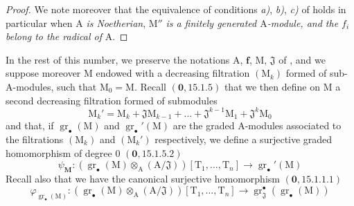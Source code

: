 \begin{proof}
We note moreover that the equivalence of conditions \emph{a)}, \emph{b)}, \emph{c)} of  holds in particular when $\mathrm{A}$ \emph{is Noetherian}, $\mathrm{M}''$ \emph{is a finitely generated $\mathrm{A}$-module, and the $f_i$ belong to the radical of} $\mathrm{A}$.
\end{proof}

\begin{env}[19.5.4]
\label{IV.19.5.4}
In the rest of this number, we preserve the notations $\mathrm{A}$, $\mathbf{f}$, $\mathrm{M}$, $\mathfrak{J}$ of , and we suppose moreover $\mathrm{M}$ endowed with a decreasing filtration $(\mathrm{M}_k)$ formed of sub-$\mathrm{A}$-modules, such that $\mathrm{M}_0=\mathrm{M}$. Recall $(\mathbf{0},15.1.5)$ that we then define on $\mathrm{M}$ a second decreasing filtration formed of submodules
\[
  \mathrm{M}_k'=\mathrm{M}_k+\mathfrak{J}\mathrm{M}_{k-1}+\ldots+\mathfrak{J}^{k-1}\mathrm{M}_1+\mathfrak{J}^k\mathrm{M}_0
\]
and that, if $\operatorname{gr}_\bullet(\mathrm{M})$ and $\operatorname{gr}_\bullet'(\mathrm{M})$ are the graded $\mathrm{A}$-modules associated to the filtrations $(\mathrm{M}_k)$ and $(\mathrm{M}_k')$ respectively, we define a surjective graded homomorphism of degree $0$ $(\mathbf{0},15.1.5.2)$
\[
  \psi_\mathbf{M}:(\operatorname{gr}_\bullet(\mathrm{M})\otimes_\mathrm{A}(\mathrm{A}/\mathfrak{J}))[\mathrm{T}_1,\ldots,\mathrm{T}_n]\to\operatorname{gr}_\bullet'(\mathrm{M})
\]
Recall also that we have the canonical surjective homomorphism $(\mathbf{0},15.1.1.1)$
\[
  \varphi_{\operatorname{gr}_\bullet(\mathrm{M})}:(\operatorname{gr}_\bullet(\mathrm{M})\otimes_\mathrm{A}(\mathrm{A}/\mathfrak{J}))[\mathrm{T}_1,\ldots,\mathrm{T}_n]\to\operatorname{gr}_\mathfrak{J}^\bullet(\operatorname{gr}_\bullet(\mathrm{M}))
\]
\end{env}

